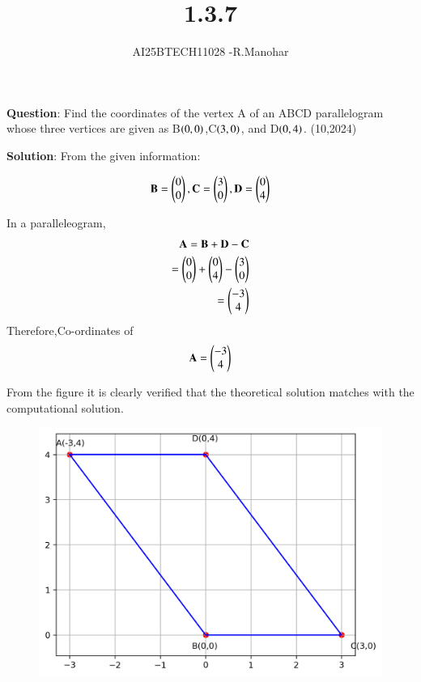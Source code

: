 \documentclass[journal,12pt,onecolumn]{IEEEtran}
\title{1.3.7}
\author{AI25BTECH11028 -R.Manohar}
\begin{document}
\maketitle
{\let\newpage\relax\maketitle}
\renewcommand{\thefigure}{\theenumi}\renewcommand{\thetable}{\theenumi}
 \bigskip

\textbf{Question}:
\noindent Find the coordinates of the  vertex A of an ABCD parallelogram whose three vertices are given as B$\left(0,0\right)$,C$\left(3,0\right)$, and D$\left(0,4\right)$.
\hfill{(10,2024)}

\textbf{Solution}: From the given information:

\begin{align}
\mathbf{B} = \begin{pmatrix}0\\0\end{pmatrix}, \mathbf{C} = \begin{pmatrix}3\\0\end{pmatrix}, \mathbf{D} = \begin{pmatrix}0\\4\end{pmatrix}
\end{align}

In a paralleleogram,
\begin{align}
\mathbf{A} = \mathbf{B} + \mathbf{D} - \mathbf{C}\\
= \begin{pmatrix}0\\0\end{pmatrix} + \begin{pmatrix}0\\4\end{pmatrix} - \begin{pmatrix}3\\0\end{pmatrix}\\
= \begin{pmatrix}-3\\4\end{pmatrix}
\end{align}
Therefore,Co-ordinates of 
\begin{align}
\mathbf{A}=\begin{pmatrix}-3\\4\end{pmatrix}
\end{align}

From the figure it is clearly verified that the theoretical solution matches with the computational solution.\\
\begin{figure}[h!]
    \centering
    \includegraphics[height=0.5\textheight, keepaspectratio]{figs/figure_1.png}
    \label{figure_1}
\end{figure}
\end{document}
